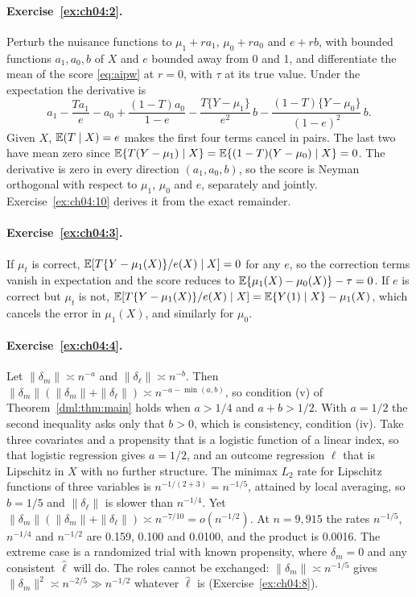 \paragraph{Exercise~\ref{ex:ch04:2}.} Perturb the nuisance functions to $\mu_1 + ra_1$, $\mu_0 + ra_0$ and $e + rb$, with bounded functions $a_1, a_0, b$ of $X$ and $e$ bounded away from 0 and 1, and differentiate the mean of the score \eqref{eq:aipw} at $r = 0$, with $\tau$ at its true value. Under the expectation the derivative is
\[
a_1 - \frac{T a_1}{e} - a_0 + \frac{(1 - T)a_0}{1 - e} - \frac{T\{Y - \mu_1\}}{e^2}\,b - \frac{(1 - T)\{Y - \mu_0\}}{(1 - e)^2}\,b.
\]
Given $X$, $\mathbb{E}(T\mid X)=e$ makes the first four terms cancel in pairs. The last two have mean zero since $\mathbb{E}\{T(Y-\mu_1)\mid X\}=\mathbb{E}\{(1-T)(Y-\mu_0)\mid X\}=0$. The derivative is zero in every direction $(a_1,a_0,b)$, so the score is Neyman orthogonal with respect to $\mu_1$, $\mu_0$ and $e$, separately and jointly. Exercise~\ref{ex:ch04:10} derives it from the exact remainder.

\paragraph{Exercise~\ref{ex:ch04:3}.} If $\mu_t$ is correct, $\mathbb{E}[T\{Y - \mu_1(X)\}/e(X) \mid X] = 0$ for any $e$, so the correction terms vanish in expectation and the score reduces to $\mathbb{E}\{\mu_1(X) - \mu_0(X)\} - \tau = 0$. If $e$ is correct but $\mu_t$ is not, $\mathbb{E}[T\{Y - \mu_1(X)\}/e(X) \mid X] = \mathbb{E}\{Y(1) \mid X\} - \mu_1(X)$, which cancels the error in $\mu_1(X)$, and similarly for $\mu_0$.

\paragraph{Exercise~\ref{ex:ch04:4}.} Let $\|\delta_m\| \asymp n^{-a}$ and $\|\delta_\ell\| \asymp n^{-b}$. Then $\|\delta_m\|(\|\delta_m\| + \|\delta_\ell\|) \asymp n^{-a - \min(a, b)}$, so condition (v) of Theorem~\ref{dml:thm:main} holds when $a > 1/4$ and $a + b > 1/2$. With $a = 1/2$ the second inequality asks only that $b > 0$, which is consistency, condition (iv). Take three covariates and a propensity that is a logistic function of a linear index, so that logistic regression gives $a = 1/2$, and an outcome regression $\ell$ that is Lipschitz in $X$ with no further structure. The minimax $L_2$ rate for Lipschitz functions of three variables is $n^{-1/(2+3)} = n^{-1/5}$, attained by local averaging, so $b = 1/5$ and $\|\delta_\ell\|$ is slower than $n^{-1/4}$. Yet $\|\delta_m\|(\|\delta_m\| + \|\delta_\ell\|) \asymp n^{-7/10} = o(n^{-1/2})$. At $n = 9{,}915$ the rates $n^{-1/5}$, $n^{-1/4}$ and $n^{-1/2}$ are 0.159, 0.100 and 0.0100, and the product is 0.0016. The extreme case is a randomized trial with known propensity, where $\delta_m = 0$ and any consistent $\hat\ell$ will do. The roles cannot be exchanged: $\|\delta_m\| \asymp n^{-1/5}$ gives $\|\delta_m\|^2 \asymp n^{-2/5} \gg n^{-1/2}$ whatever $\hat\ell$ is (Exercise~\ref{ex:ch04:8}).

